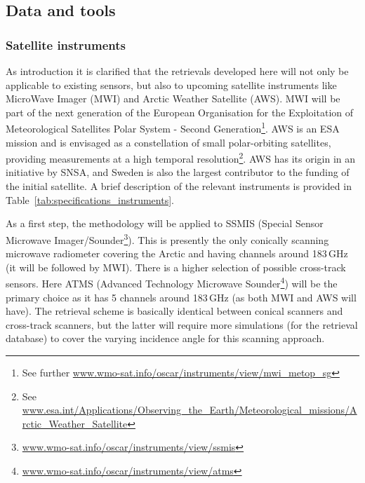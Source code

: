 \documentclass[12pt,oneside,a4paper]{article}
\begin{document}
\subsection{Data and tools}
% 
\subsubsection{Satellite instruments}

As introduction it is clarified that the retrievals developed here will not
only be applicable to existing sensors, but also to upcoming satellite
instruments like MicroWave Imager (MWI) and Arctic Weather Satellite (AWS). MWI
will be part of the next generation of the European Organisation for the
Exploitation of Meteorological Satellites Polar System - Second
Generation\footnote{See further
  \url{www.wmo-sat.info/oscar/instruments/view/mwi_metop_sg}}. AWS is an ESA
mission and is envisaged as a constellation of small polar-orbiting satellites,
providing measurements at a high temporal resolution\footnote{See
  \url{www.esa.int/Applications/Observing_the_Earth/Meteorological_missions/Arctic_Weather_Satellite}}.
AWS has its origin in an initiative by SNSA, and Sweden is also the largest
contributor to the funding of the initial satellite. A brief description of the
relevant instruments is provided in Table~\ref{tab:specifications_instruments}.

As a first step, the methodology will be applied to SSMIS (Special Sensor
Microwave
Imager/Sounder\footnote{\url{www.wmo-sat.info/oscar/instruments/view/ssmis}}).
This is presently the only conically scanning microwave radiometer covering the
Arctic and having channels around 183\,GHz (it will be followed by MWI). There is a
higher selection of possible cross-track sensors. Here ATMS (Advanced
Technology Microwave
Sounder\footnote{\url{www.wmo-sat.info/oscar/instruments/view/atms}}) will be
the primary choice as it has 5 channels around 183\,GHz (as both MWI and AWS
will have). The retrieval scheme is basically identical between conical
scanners and cross-track scanners, but the latter will require more simulations
(for the retrieval database) to cover the varying incidence angle for this
scanning approach.
\end{document}
